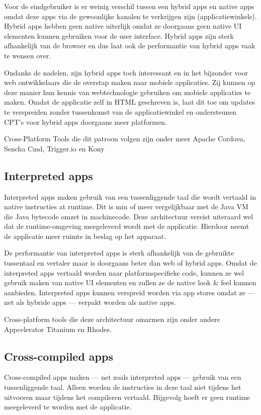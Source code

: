 \documentclass[a4paper]{IEEEconf}
\begin{document}
Voor de eindgebruiker is er weinig verschil tussen een hybrid apps en native apps omdat deze apps via de gewoonlijke kanalen te verkrijgen zijn (applicatiewinkels). Hybrid apps hebben geen native uiterlijk omdat ze doorgaans geen native UI elementen kunnen gebruiken voor de user interface. Hybrid apps zijn sterk afhankelijk van de browser en dus laat ook de performantie van hybrid apps vaak te wensen over. 

Ondanks de nadelen, zijn hybrid apps toch interessant en in het bijzonder voor web ontwikkelaars die de overstap maken naar mobiele applicaties. Zij kunnen op deze manier hun kennis van webtechnologie gebruiken om mobiele applicaties te maken. Omdat de applicatie zelf in HTML geschreven is, laat dit toe om updates te verspreiden zonder tussenkomst van de applicatiewinkel en ondersteunen CPT's voor hybrid apps doorgaans meer platformen.

Cross-Platform Tools die dit patroon volgen zijn onder meer Apache Cordova, Sencha Cmd, Trigger.io en Kony

\subsection{Interpreted apps}

Interpreted apps maken gebruik van een tussenliggende taal die wordt vertaald in native instructies at runtime. Dit is min of meer vergelijkbaar met de Java VM die Java bytecode omzet in machinecode. Deze architectuur vereist uiteraard wel dat de runtime-omgeving meegeleverd wordt met de applicatie. Hierdoor neemt de applicatie meer ruimte in beslag op het apparaat.

De performantie van interpreted apps is sterk afhankelijk van de gebruikte tussentaal en vertaler maar is doorgaans beter dan web of hybrid apps. Omdat de interpreted apps vertaald worden naar platformspecifieke code, kunnen ze wel gebruik maken van native UI elementen en zullen ze de native look \& feel kunnen aanbieden. Interpreted apps kunnen verspreid worden via app stores omdat ze --- net als hybride apps --- verpakt worden als native apps. 
 
Cross-platform tools die deze architectuur omarmen zijn onder andere Appcelerator Titanium en Rhodes.

\subsection{Cross-compiled apps}

Cross-compiled apps maken --- net zoals interpreted apps --- gebruik van een tussenliggende taal. Alleen worden de instructies in deze taal niet tijdens het uitvoeren maar tijdens het compileren vertaald. Bijgevolg hoeft er geen runtime meegeleverd te worden met de applicatie.
\end{document}
